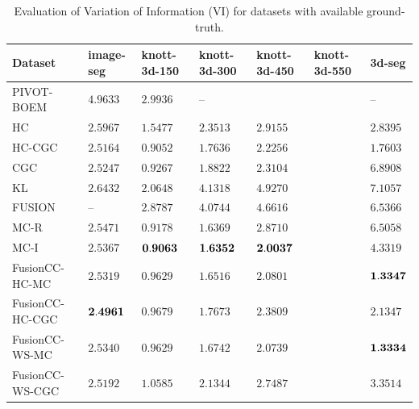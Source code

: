 \documentclass[10pt,twocolumn,letterpaper]{article}
\theoremstyle{definition}
\begin{document}
\begin{table}[H]
   \tiny
   \centering
   \caption{Evaluation of Variation of Information (VI) for datasets with available ground-truth.}
   \label{tab:eval}
   \begin{tabular}{lllllll}
      \toprule
         Dataset          &  image-seg   & knott-3d-150 & knott-3d-300   & knott-3d-450 & knott-3d-550 &3d-seg\\
      \midrule 
         PIVOT-BOEM       &   $ 4.9633$  &    $ 2.9936$ &       --       &              &              &  --\\ 
         HC               &   $ 2.5967$  &    $ 1.5477$ &    $ 2.3513$   &    $ 2.9155$ &              & $       2.8395$\\
         HC-CGC           &   $ 2.5164$  &    $ 0.9052$ &    $ 1.7636$   &    $ 2.2256$ &              & $       1.7603$ \\
         CGC              &   $ 2.5247$  &    $ 0.9267$ &    $ 1.8822$   &    $ 2.3104$ &              & $       6.8908$ \\
         KL               &   $ 2.6432$  &    $ 2.0648$ &    $ 4.1318$   &    $ 4.9270$ &              & $       7.1057$\\
         FUSION           &      --      &    $ 2.8787$ &    $ 4.0744$   &    $ 4.6616$ &              & $       6.5366$ \\
         MC-R             &   $ 2.5471$  &    $ 0.9178$ &    $ 1.6369$   &    $ 2.8710$ &              & $       6.5058$\\   
         MC-I             &   $ 2.5367$  & $\bf 0.9063$ & $\bf 1.6352$   & $\bf 2.0037$ &              & $       4.3319$\\  
         FusionCC-HC-MC   &   $ 2.5319$  &    $ 0.9629$ &    $ 1.6516$   &    $ 2.0801$ &              & $\bf    1.3347$ \\  
         FusionCC-HC-CGC  &$\bf 2.4961$  &    $ 0.9679$ &    $ 1.7673$   &    $ 2.3809$ &              & $       2.1347$ \\  
         FusionCC-WS-MC   &   $ 2.5340$  &    $ 0.9629$ &    $ 1.6742$   &    $ 2.0739$ &              & $\bf    1.3334$ \\  
         FusionCC-WS-CGC  &   $ 2.5192$  &    $ 1.0585$ &    $ 2.1344$   &    $ 2.7487$ &              & $       3.3514$ \\      
      \bottomrule
   \end{tabular}
\end{table}
\end{document}
